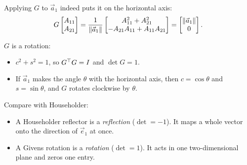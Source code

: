 Applying $G$ to $\vec{a}_1$ indeed puts it on the horizontal axis:
\begingroup\renewcommand{\arraystretch}{1.5}
\begin{equation}
  G\begin{bmatrix} A_{11} \\ A_{21} \end{bmatrix} = \frac{1}{\left\lVert \vec{a}_1 \right\rVert}\begin{bmatrix} A_{11}^2 + A_{21}^2 \\ -A_{21}A_{11} + A_{11}A_{21} \end{bmatrix} = \begin{bmatrix} \left\lVert \vec{a}_1 \right\rVert \\ 0 \end{bmatrix}.
\end{equation}
\endgroup

\newpage
$G$ is a rotation:
\begin{itemize}
  \item $c^2 + s^2 = 1$, so $G^\top G = I$ and $\det G = 1$.
  \item If $\vec{a}_1$ makes the angle $\theta$ with the horizontal axis, then $c = \cos\theta$ and $s = \sin\theta$, and $G$ rotates clockwise by $\theta$.
\end{itemize}
Compare with Householder:
\begin{itemize}
  \item A Householder reflector is a \emph{reflection} ($\det = -1$). It maps a whole vector onto the direction of $\vec{e}_1$ at once.
  \item A Givens rotation is a \emph{rotation} ($\det = 1$). It acts in one two-dimensional plane and zeros one entry.
\end{itemize}

